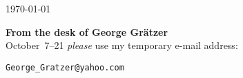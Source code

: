 \documentclass{sample}
\begin{document}
\begin{flushright}
   \today
\end{flushright}
\textbf{From the desk of George Gr\"{a}tzer}\\[22pt]
October~7--21 \emph{please} use my 
temporary e-mail address:
\begin{center}
   \texttt{George\_Gratzer@yahoo.com}
\end{center}
\end{document}
